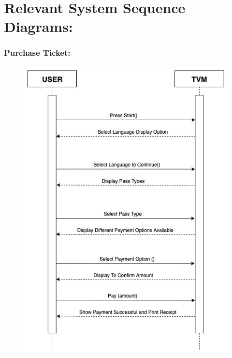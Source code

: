 \documentclass[11pt,oneside]{book}
\begin{document}
\clearpage
\section{Relevant System Sequence Diagrams:}

\subsubsection{Purchase Ticket:}
\begin{figure}[htp]
\includegraphics[width = 12cm]{images/image1.jpg} 
    \centering
\end{figure}
\clearpage
\end{document}
